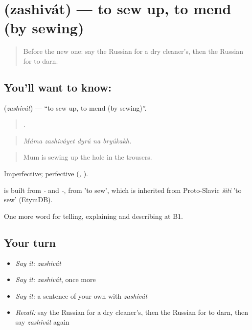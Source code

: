 \section[\texorpdfstring{\ru{зашивать} (zashivát)}{зашивать (zashivát)}]{ (zashivát) — to sew up, to mend (by sewing)}

\label{lesson:RU-C448-zashivat}



\begin{quote}
Before the new one: say the Russian for a dry cleaner's, then the Russian for to darn.
\end{quote}

\subsection*{You'll want to know: }
\textbf{} (\emph{zashivát}) — \textquotedblleft{}to sew up, to mend (by sewing)\textquotedblright{}.

\begin{quote}
    .
\end{quote}

\begin{quote}
\emph{Máma zashiváyet dyrú na bryúkakh.}
\end{quote}

\begin{quote}
Mum is sewing up the hole in the trousers.
\end{quote}

Imperfective; perfective \emph{} (\emph{, }).

\begin{cousinweb}
\emph{} is built from \emph{-} and \emph{-}, from \emph{} 'to sew', which is inherited from Proto-Slavic \emph{šiti} 'to sew' (EtymDB).
\end{cousinweb}

\begin{grammarlens}[title={What you've built}]
One more word for telling, explaining and describing at B1.
\end{grammarlens}

\subsection*{Your turn}
\begin{itemize}
\raggedright
  \item \emph{Say it:} \emph{zashivát}
  \item \emph{Say it:} \emph{zashivát}, once more
  \item \emph{Say it:} a sentence of your own with \emph{zashivát}
  \item \emph{Recall:} say the Russian for a dry cleaner's, then the Russian for to darn, then say \emph{zashivát} again
\end{itemize}

